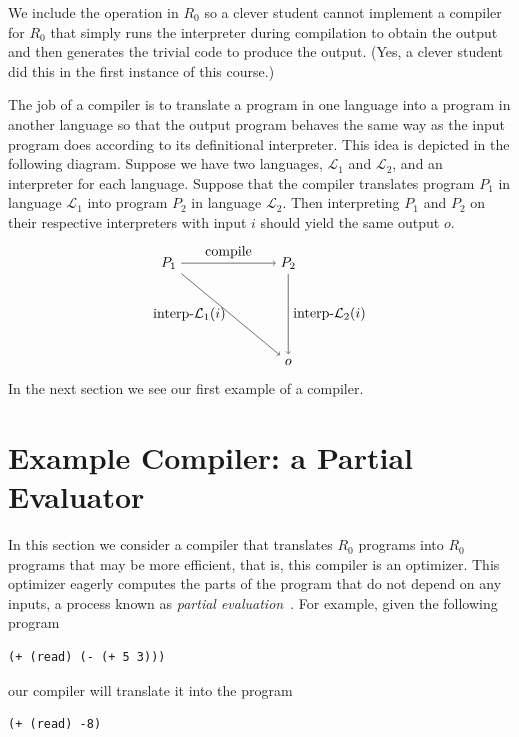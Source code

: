 \documentclass[11pt]{book}
\begin{document}
We include the  operation in $R_0$ so a clever student
cannot implement a compiler for $R_0$ that simply runs the interpreter
during compilation to obtain the output and then generates the trivial
code to produce the output. (Yes, a clever student did this in the
first instance of this course.)

The job of a compiler is to translate a program in one language into a
program in another language so that the output program behaves the
same way as the input program does according to its definitional
interpreter. This idea is depicted in the following diagram. Suppose
we have two languages, $\mathcal{L}_1$ and $\mathcal{L}_2$, and an
interpreter for each language.  Suppose that the compiler translates
program $P_1$ in language $\mathcal{L}_1$ into program $P_2$ in
language $\mathcal{L}_2$.  Then interpreting $P_1$ and $P_2$ on their
respective interpreters with input $i$ should yield the same output
$o$.
\begin{equation} \label{eq:compile-correct}
\begin{tikzpicture}[baseline=(current  bounding  box.center)]
 \node (p1) at (0,  0) {$P_1$};
 \node (p2) at (3,  0) {$P_2$};
 \node (o)  at (3, -2.5) {$o$};

 \path[->] (p1) edge [above] node {compile} (p2);
 \path[->] (p2) edge [right] node {interp-$\mathcal{L}_2$($i$)} (o);
 \path[->] (p1) edge [left]  node {interp-$\mathcal{L}_1$($i$)} (o);
\end{tikzpicture}
\end{equation}
In the next section we see our first example of a compiler.


\section{Example Compiler: a Partial Evaluator}
\label{sec:partial-evaluation}

In this section we consider a compiler that translates $R_0$ programs
into $R_0$ programs that may be more efficient, that is, this compiler
is an optimizer. This optimizer eagerly computes the parts of the
program that do not depend on any inputs, a process known as
\emph{partial evaluation}~\cite{Jones:1993uq}. For example, given the
following program
\begin{lstlisting}
(+ (read) (- (+ 5 3)))
\end{lstlisting}
our compiler will translate it into the program
\begin{lstlisting}
(+ (read) -8)
\end{lstlisting}
\end{document}
